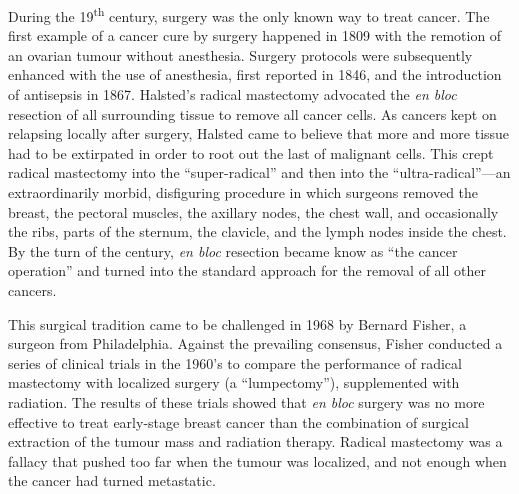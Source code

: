 During the 19\textsuperscript{th} century, surgery was the only known way to
treat cancer.  The first example of a cancer cure by surgery happened in 1809
with the remotion of an ovarian tumour without anesthesia.  Surgery protocols
were subsequently enhanced with the use of anesthesia, first reported in
1846,\cite{warren_inhalation_1846} and the introduction of antisepsis in
1867.\cite{lister_antiseptic_1867} Halsted's radical mastectomy advocated the
\emph{en bloc} resection of all surrounding tissue to remove all cancer cells.
As cancers kept on relapsing locally after surgery, Halsted came to believe that
more and more tissue had to be extirpated in order to root out the last of
malignant cells.  This crept radical mastectomy into the ``super-radical'' and
then into the ``\mbox{ultra-radical}''---an extraordinarily morbid, disfiguring
procedure in which surgeons removed the breast, the pectoral muscles, the
axillary nodes, the chest wall, and occasionally the ribs, parts of the sternum,
the clavicle, and the lymph nodes inside the chest.\cite{mukherjee_emperor_2011}
By the turn of the century, \emph{en bloc} resection became know as ``the cancer
operation'' and turned into the standard approach for the removal of all other
cancers.

This surgical tradition came to be challenged in 1968 by Bernard Fisher, a
surgeon from Philadelphia.  Against the prevailing consensus, Fisher conducted a
series of clinical trials in the 1960's to compare the performance of radical
mastectomy with localized surgery (a ``lumpectomy''), supplemented with
radiation.  The results of these trials showed that \emph{en bloc} surgery was
no more effective to treat early-stage breast cancer than the combination of
surgical extraction of the tumour mass and radiation
therapy.\cite{fisher_five-year_1985,fisher_ten-year_1985} Radical mastectomy was
a fallacy that pushed too far when the tumour was localized, and not enough when
the cancer had turned metastatic.

